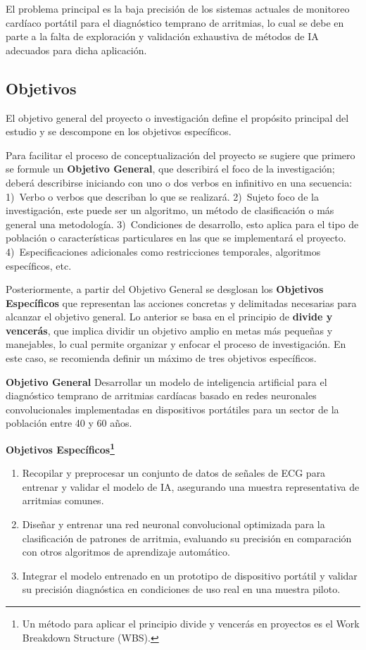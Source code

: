 \documentclass[12pt,letterpaper,spanish, twoside]{article}
\begin{document}
\ej El problema principal es la baja precisión de los sistemas actuales de monitoreo cardíaco portátil para el diagnóstico temprano de arritmias, lo cual se debe en parte a la falta de exploración y validación exhaustiva de métodos de IA adecuados para dicha aplicación.

\subsection{Objetivos}
El objetivo general del proyecto o investigación define el propósito principal del estudio y se descompone en los objetivos específicos.

Para facilitar el proceso de conceptualización del proyecto se sugiere que primero se formule un \textbf{Objetivo General}, que describirá el foco de la investigación; deberá describirse iniciando con uno o dos verbos en infinitivo en una secuencia: 1)~Verbo o verbos que describan lo que se realizará. 2)~Sujeto foco de la investigación, este puede ser un algoritmo, un método de clasificación o más general una metodología. 3)~Condiciones de desarrollo, esto aplica para el tipo de población o características particulares en las que se implementará el proyecto. 4)~Especificaciones adicionales como restricciones temporales, algoritmos específicos, etc.

Posteriormente, a partir del Objetivo General se desglosan los \textbf{Objetivos Específicos} que representan las acciones concretas y delimitadas necesarias para alcanzar el objetivo general. Lo anterior se basa en el principio de \textbf{divide y vencerás}, que implica dividir un objetivo amplio en metas más pequeñas y manejables, lo cual permite organizar y enfocar el proceso de investigación. En este caso, se recomienda definir un máximo de tres objetivos específicos.

\ej 

\textbf{Objetivo General} Desarrollar un modelo de inteligencia artificial para el diagnóstico temprano de arritmias cardíacas basado en redes neuronales convolucionales implementadas en dispositivos portátiles para un sector de la población entre 40 y 60 años.

\textbf{Objetivos Específicos\footnote{Un método para aplicar el principio divide y vencerás en proyectos es el Work Breakdown Structure (WBS).}}
\begin{enumerate}
 \item Recopilar y preprocesar un conjunto de datos de señales de ECG para entrenar y validar el modelo de IA, asegurando una muestra representativa de arritmias comunes.
 \item Diseñar y entrenar una red neuronal convolucional optimizada para la clasificación de patrones de arritmia, evaluando su precisión en comparación con otros algoritmos de aprendizaje automático.
 \item Integrar el modelo entrenado en un prototipo de dispositivo portátil y validar su precisión diagnóstica en condiciones de uso real en una muestra piloto.
\end{enumerate}
\end{document}
